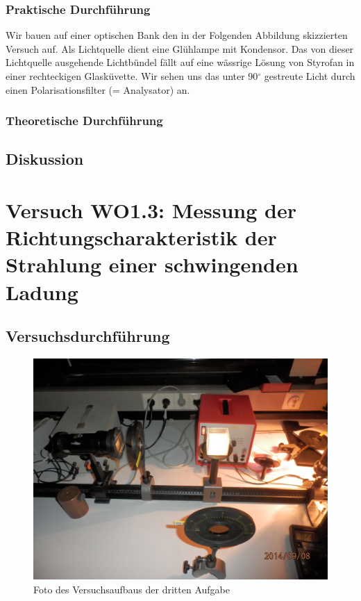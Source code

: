 \documentclass[12pt]{scrartcl}
\begin{document}
\subsubsection{Praktische Durchführung}
Wir bauen auf einer optischen Bank den in der Folgenden Abbildung skizzierten
Versuch auf.
Als Lichtquelle dient eine Glühlampe mit Kondensor. Das von dieser Lichtquelle ausgehende Lichtbündel fällt auf eine wässrige Lösung von Styrofan in einer rechteckigen Glasküvette.
Wir sehen uns das unter
90$^\circ$ gestreute Licht durch einen Polarisationsfilter (= Analysator) an. 
\subsubsection{Theoretische Durchführung}
\subsection{Diskussion}

\section{Versuch WO1.3:
Messung der Richtungscharakteristik der Strahlung einer schwingenden Ladung}
\subsection{Versuchsdurchführung}

\begin{figure}[H]
\centering
    \includegraphics[scale = 0.1]{aufgabe_3.JPG}
  	\caption[Foto des Versuchsaufbaus der dritten Aufgabe]{Foto des Versuchsaufbaus der dritten Aufgabe}
  \label{fig:aufgabe_3}
\end{figure}
\end{document}

